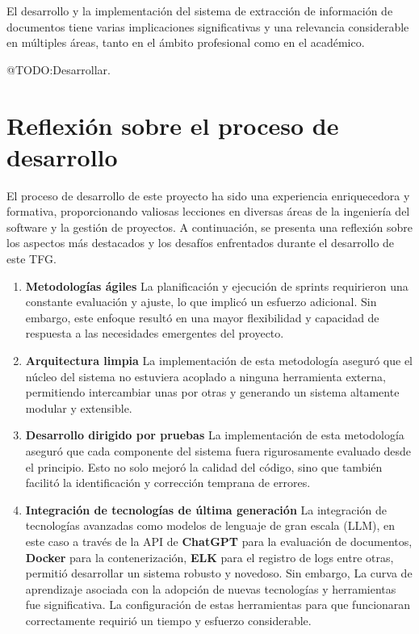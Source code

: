 El desarrollo y la implementación del sistema de extracción de información de documentos tiene varias implicaciones
significativas y una relevancia considerable en múltiples áreas, tanto en el ámbito profesional como en el académico.


\colorbox{color_highlight}{@TODO:Desarrollar.}


\section{Reflexión sobre el proceso de desarrollo}

El proceso de desarrollo de este proyecto ha sido una experiencia enriquecedora y formativa, proporcionando valiosas
lecciones en diversas áreas de la ingeniería del software y la gestión de proyectos.
A continuación, se presenta una reflexión sobre los aspectos más destacados y los desafíos enfrentados durante el
desarrollo de este TFG.

\begin{enumerate}
    \item \textbf{Metodologías ágiles}
    La planificación y ejecución de sprints requirieron una constante evaluación y ajuste, lo que implicó un esfuerzo
    adicional.
    Sin embargo, este enfoque resultó en una mayor flexibilidad y capacidad de respuesta a las necesidades emergentes
    del proyecto.
    \item \textbf{Arquitectura limpia}
    La implementación de esta metodología aseguró que el núcleo del sistema no estuviera acoplado a ninguna
    herramienta externa, permitiendo intercambiar unas por otras y generando un sistema altamente modular y extensible.
    \item \textbf{Desarrollo dirigido por pruebas}
    La implementación de esta metodología aseguró que cada componente del sistema fuera rigurosamente evaluado desde el
    principio.
    Esto no solo mejoró la calidad del código, sino que también facilitó la identificación y corrección temprana de
    errores.
    \item \textbf{Integración de tecnologías de última generación}
    La integración de tecnologías avanzadas como modelos de lenguaje de gran escala (LLM), en este caso a través de
    la API de \textbf{ChatGPT} para la evaluación de documentos, \textbf{Docker} para la contenerización, \textbf{ELK}
    para el registro de logs entre otras, permitió desarrollar un sistema robusto y novedoso.
    Sin embargo, La curva de aprendizaje asociada con la adopción de nuevas tecnologías y herramientas fue
    significativa.
    La configuración de estas herramientas para que funcionaran correctamente requirió un tiempo y esfuerzo
    considerable.
\end{enumerate}

